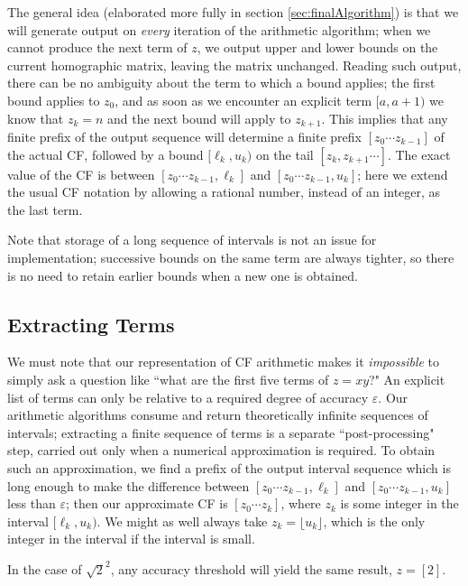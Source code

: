 \documentclass[11pt, oneside]{amsart}   	%
\begin{document}
The general idea (elaborated more fully in section \ref{sec:finalAlgorithm}) is that we will generate output on \emph{every}
 iteration of the arithmetic algorithm; when we cannot produce the next term of $z$, we output upper and lower bounds on the current
 homographic matrix, leaving the matrix unchanged. Reading such output, there can be no ambiguity about the term to which a bound 
 applies; the first bound applies to $z_0$, and as soon as we encounter an explicit term $[a,a+1)$ we know that $z_k=n$ and the next bound will apply to $z_{k+1}$. 
 This implies that any finite prefix of the output sequence will determine a finite prefix $[z_0 \cdots z_{k-1}]$ of the actual CF, followed by a bound
 $[\ell_k,u_k)$ on the tail $[z_k, z_{k+1}\cdots]$. The exact value of the CF is between $[z_0 \cdots z_{k-1}, \ell_k]$ and
 $[z_0 \cdots z_{k-1}, u_k]$; here we extend the usual CF notation by allowing a rational number, instead of an integer, as the last term.

Note that storage of a long sequence of intervals is not an issue for implementation;
successive bounds on the same term are always tighter, so there is no need to retain earlier bounds when a new one is obtained. 

\subsection{Extracting Terms}
We must note that our representation of CF arithmetic makes it \emph{impossible} to simply ask a question like ``what are the first
five terms of $z = xy$?" An explicit list of terms can only be relative to a required degree of accuracy $\varepsilon$. Our arithmetic
algorithms consume and return theoretically infinite sequences of intervals; extracting a finite sequence of terms is a separate
``post-processing" step, carried out only when a numerical approximation is required.
To obtain such an approximation, we find a prefix of
the output interval sequence which is long enough to make the difference between $[z_0 \cdots z_{k-1}, \ell_k]$ and $[z_0 \cdots
z_{k-1}, u_k]$ less than $\varepsilon$; then our approximate CF is $[z_0 \cdots z_k]$, where $z_k$ is some integer in the interval
$[\ell_k,u_k)$. We might as well always take $z_k = \lfloor u_k \rfloor$, which is the only integer in the interval if the interval is small. 

In the case of $\sqrt{2}^2$, any accuracy threshold will yield the same result, $z = [2]$.
\end{document}
